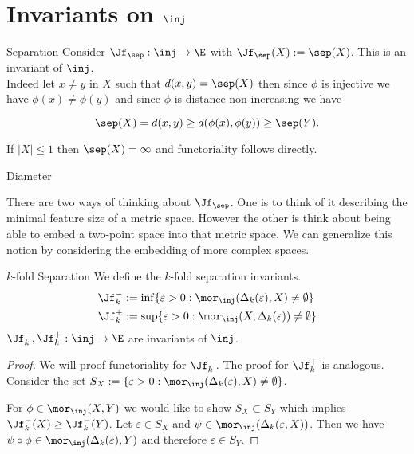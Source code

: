 \section{Invariants on $\inj$}

\begin{example}{Separation}{}
Consider $\Jf_\sep: \inj \to \E$ with $\Jf_\sep(X) := \sep(X)$. This is an invariant of $\inj$. \\

Indeed let $x \neq y$ in $X$ such that $d(x,y) = \sep(X)$ then since $\phi$ is injective we have $\phi(x) \neq \phi(y)$ and since $\phi$ is distance non-increasing we have

$$\sep(X) = d(x,y) \ge d(\phi(x), \phi(y)) \ge \sep(Y).$$

If $|X| \le 1$ then $\sep(X) = \infty$ and functoriality follows directly.
\end{example}

\begin{example}{Diameter}{}
\end{example}

There are two ways of thinking about $\Jf_\sep$. One is to think of it describing the minimal feature size of a metric space. However the other is think about being able to embed a two-point space into that metric space. We can generalize this notion by considering the embedding of more complex spaces.

\begin{defprop}{$k$-fold Separation}{}
We define the $k$-fold separation invariants.
\begin{align*}
\Jf^-_k &:= \inf \{\varepsilon > 0: \mor_\inj(\Delta_k(\varepsilon), X) \neq \emptyset\} \\
\Jf^+_k &:= \sup \{\varepsilon > 0: \mor_\inj(X,\Delta_k(\varepsilon)) \neq \emptyset\}
\end{align*}
$\Jf^-_k,\Jf^+_k: \inj \to \E$ are invariants of $\inj$.
\end{defprop}

\begin{proof}
We will proof functoriality for $\Jf^-_k$. The proof for $\Jf^+_k$ is analogous. Consider the set $S_X := \{\varepsilon > 0: \mor_\inj(\Delta_k(\varepsilon), X) \neq \emptyset\}$.

For $\phi \in \mor_\inj(X,Y)$ we would like to show $S_X \subset S_Y$ which implies $\Jf^-_k(X) \geq \Jf^-_k(Y)$. Let $\varepsilon \in S_X$ and $\psi \in \mor_\inj(\Delta_k(\varepsilon, X))$. Then we have $\psi \circ \phi \in \mor_\inj(\Delta_k(\varepsilon), Y)$ and therefore $\varepsilon \in S_Y$.
\end{proof}

